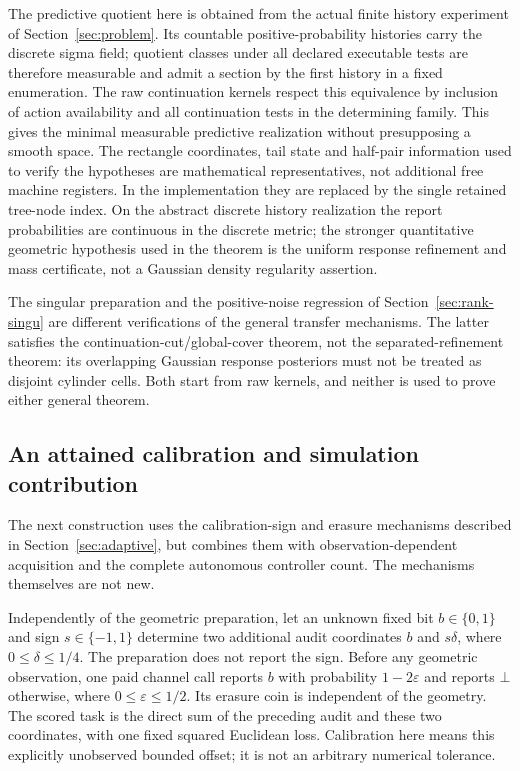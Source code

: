 The predictive quotient here is obtained from the actual finite history experiment of Section~\ref{sec:problem}. Its countable positive-probability histories carry the discrete sigma field; quotient classes under all declared executable tests are therefore measurable and admit a section by the first history in a fixed enumeration. The raw continuation kernels respect this equivalence by inclusion of action availability and all continuation tests in the determining family. This gives the minimal measurable predictive realization without presupposing a smooth space. The rectangle coordinates, tail state and half-pair information used to verify the hypotheses are mathematical representatives, not additional free machine registers. In the implementation they are replaced by the single retained tree-node index. On the abstract discrete history realization the report probabilities are continuous in the discrete metric; the stronger quantitative geometric hypothesis used in the theorem is the uniform response refinement and mass certificate, not a Gaussian density regularity assertion.

The singular preparation and the positive-noise regression of Section~\ref{sec:rank-singu} are different verifications of the general transfer mechanisms. The latter satisfies the continuation-cut/global-cover theorem, not the separated-refinement theorem: its overlapping Gaussian response posteriors must not be treated as disjoint cylinder cells. Both start from raw kernels, and neither is used to prove either general theorem.

\subsection{An attained calibration and simulation contribution}
The next construction uses the calibration-sign and erasure mechanisms described in Section~\ref{sec:adaptive}, but combines them with observation-dependent acquisition and the complete autonomous controller count. The mechanisms themselves are not new.

Independently of the geometric preparation, let an unknown fixed bit $b\in\{0,1\}$ and sign $s\in\{-1,1\}$ determine two additional audit coordinates $b$ and $s\delta$, where $0\le\delta\le1/4$. The preparation does not report the sign. Before any geometric observation, one paid channel call reports $b$ with probability $1-2\varepsilon$ and reports $\bot$ otherwise, where $0\le\varepsilon\le1/2$. Its erasure coin is independent of the geometry. The scored task is the direct sum of the preceding audit and these two coordinates, with one fixed squared Euclidean loss. Calibration here means this explicitly unobserved bounded offset; it is not an arbitrary numerical tolerance.

